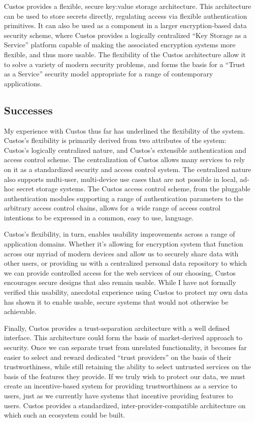Custos provides a flexible, secure key:value storage
architecture. This architecture can be used to store secrets directly,
regulating access via flexible authentication primitives. It can also
be used as a component in a larger encryption-based data security
scheme, where Custos provides a logically centralized ``Key Storage as
a Service'' platform capable of making the associated encryption
systems more flexible, and thus more usable. The flexibility of the
Custos architecture allow it to solve a variety of modern security
problems, and forms the basis for a ``Trust as a Service'' security
model appropriate for a range of contemporary applications.

\subsection{Successes}

My experience with Custos thus far has underlined the flexibility of
the system. Custos's flexibility is primarily derived from two
attributes of the system: Custos's logically centralized nature, and
Custos's extensible authentication and access control scheme. The
centralization of Custos allows many services to rely on it as a
standardized security and access control system. The centralized
nature also supports multi-user, multi-device use cases that are not
possible in local, ad-hoc secret storage systems. The Custos access
control scheme, from the pluggable authentication modules supporting a
range of authentication parameters to the arbitrary access control
chains, allows for a wide range of access control intentions to be
expressed in a common, easy to use, language.

Custos's flexibility, in turn, enables usability improvements across a
range of application domains. Whether it's allowing for encryption
system that function across our myriad of modern devices and allow us
to securely share data with other users, or providing us with a
centralized personal data repository to which we can provide
controlled access for the web services of our choosing, Custos
encourages secure designs that also remain usable. While I have not
formally verified this usability, anecdotal experience using Custos to
protect my own data has shown it to enable usable, secure systems that
would not otherwise be achievable.

Finally, Custos provides a trust-separation architecture with a well
defined interface. This architecture could form the basis of
market-derived approach to security. Once we can separate trust from
unrelated functionality, it becomes far easier to select and reward
dedicated ``trust providers'' on the basis of their trustworthiness,
while still retaining the ability to select untrusted services on the
basis of the features they provide. If we truly wish to protect our
data, we must create an incentive-based system for providing
trustworthiness as a service to users, just as we currently have
systems that incentive providing features to users. Custos provides a
standardized, inter-provider-compatible architecture on which such an
ecosystem could be built.

